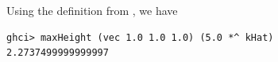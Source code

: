 Using the definition from , we have

\begin{lstlisting}
ghci> maxHeight (vec 1.0 1.0 1.0) (5.0 *^ kHat)
2.2737499999999997
\end{lstlisting}
